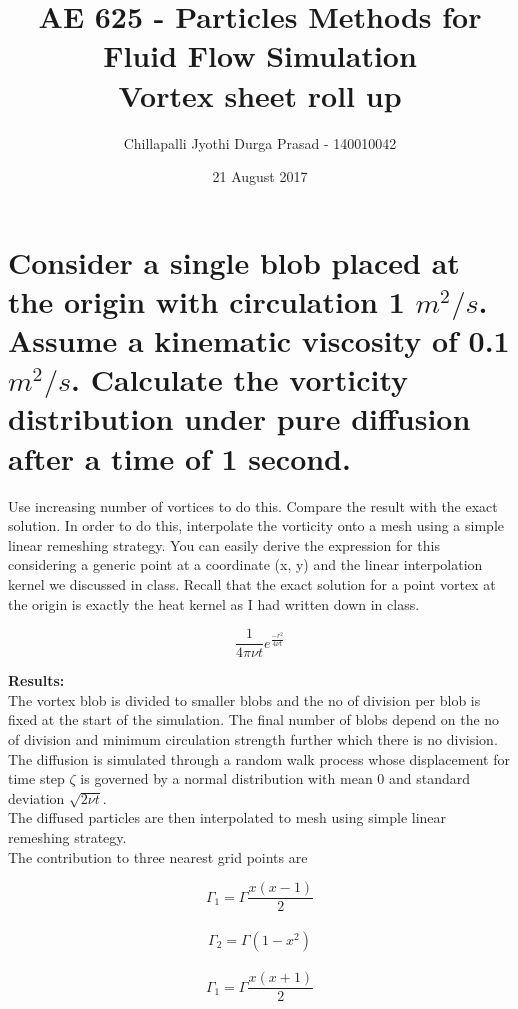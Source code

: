 \documentclass[a4paper,11pt]{article}
\title{AE 625 - Particles Methods for Fluid Flow Simulation \\ Vortex sheet roll up}
\author{Chillapalli Jyothi Durga Prasad - 140010042 }
\date{21 August 2017}
\begin{document}
\maketitle


\tableofcontents
\listoffigures


\newpage
\section{Consider a single blob placed at the origin with circulation 1 $m^2/s$. Assume a kinematic viscosity of 0.1 $m^2/s$. Calculate the vorticity distribution under pure diffusion after a time of 1 second.}

\indent Use increasing number of vortices to do this. Compare the result with the exact solution. In order to do this, interpolate the vorticity onto a mesh using a simple linear remeshing strategy. You can easily derive the expression for this considering a generic point at a coordinate (x, y) and the linear interpolation kernel we discussed in class. Recall that the exact solution for a point vortex at the origin is exactly the heat kernel as I had written down in class.\\

\begin{centering}
    $$\frac{1}{4 \pi \nu t} e^{\frac{-r^2}{4 \nu t}}$$
\end{centering}


\textbf{Results:}\\

The vortex blob is divided to smaller blobs and the no of division per blob is fixed at the start of the simulation. The final number of blobs depend on the no of division and minimum circulation strength further which there is no division.\\


The diffusion is simulated through a random walk process whose displacement for time step $\zeta$ is governed by a normal distribution with mean 0 and standard deviation $\sqrt{2\nu t}$. \\

The diffused particles are then interpolated to mesh using simple linear remeshing strategy.\\

The contribution to three nearest grid points are

\begin{centering}
    $$\Gamma _{1} = \Gamma \frac{x(x - 1)}{2}$$\\
    $$\Gamma _{2} = \Gamma (1 - x^{2})$$\\
    $$\Gamma _{1} = \Gamma \frac{x(x + 1)}{2}$$\\
\end{centering}
\end{document}
